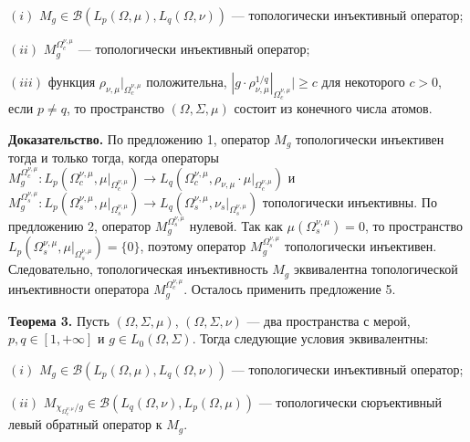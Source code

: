\documentclass[11pt,twoside]{article}
\begin{document}
$(i)$ $M_g\in\mathcal{B}(L_p(\Omega,\mu), L_q(\Omega,\nu))$ --- топологически инъективный оператор;

$(ii)$ $M_g^{\Omega_c^{\nu,\mu}}$ --- топологически инъективный оператор;

$(iii)$ функция $\rho_{\nu,\mu}|_{\Omega_c^{\nu,\mu}}$ положительна, $|g\cdot\rho_{\nu,\mu}^{1/q}|_{\Omega_c^{\nu,\mu}}|\geq c$ для некоторого $c>0$, если $p\neq q$, то пространство $(\Omega,\Sigma,\mu)$ состоит из конечного числа атомов.

\textbf{Доказательство.} По предложению 1, оператор $M_g$ топологически инъективен тогда и только тогда, когда операторы $M_g^{\Omega_c^{\nu,\mu}}:L_p(\Omega_c^{\nu,\mu},\mu|_{\Omega_c^{\nu,\mu}})\to L_q(\Omega_c^{\nu,\mu},\rho_{\nu,\mu}\cdot\mu|_{\Omega_c^{\nu,\mu}})$ и $M_g^{\Omega_s^{\nu,\mu}}:L_p(\Omega_s^{\nu,\mu},\mu|_{\Omega_s^{\nu,\mu}})\to L_q(\Omega_s^{\nu,\mu},\nu_s|_{\Omega_s^{\nu,\mu}})$ топологически инъективны. По предложению 2, оператор $M_g^{\Omega_s^{\nu,\mu}}$ нулевой. Так как $\mu(\Omega_s^{\nu,\mu})=0$, то пространство $L_p(\Omega_s^{\nu,\mu},\mu|_{\Omega_s^{\nu,\mu}})=\{0\}$, поэтому оператор $M_g^{\Omega_s^{\nu,\mu}}$ топологически инъективен. Следовательно, топологическая инъективность $M_g$ эквивалентна топологической инъективности оператора  $M_g^{\Omega_c^{\nu,\mu}}$. Осталось применить предложение 5.

\textbf{Теорема 3.} Пусть $(\Omega,\Sigma,\mu)$, $(\Omega,\Sigma,\nu)$ --- два пространства с мерой, $p,q\in[1,+\infty]$ и $g\in L_0(\Omega,\Sigma)$. Тогда следующие условия эквивалентны:

$(i)$ $M_g\in\mathcal{B}(L_p(\Omega,\mu),L_q(\Omega,\nu))$ --- топологически инъективный оператор;

$(ii)$ $M_{\chi_{\Omega_c^{\nu,\mu}}/g}\in\mathcal{B}(L_q(\Omega,\nu), L_p(\Omega,\mu))$ --- топологически сюръективный левый обратный оператор к $M_g$.
\end{document}
